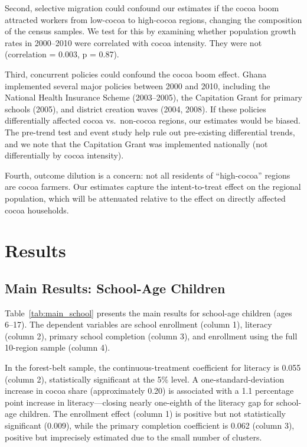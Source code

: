 \documentclass[12pt]{article}
\begin{document}
Second, selective migration could confound our estimates if the cocoa boom attracted workers from low-cocoa to high-cocoa regions, changing the composition of the census samples. We test for this by examining whether population growth rates in 2000--2010 were correlated with cocoa intensity. They were not (correlation = 0.003, p = 0.87).

Third, concurrent policies could confound the cocoa boom effect. Ghana implemented several major policies between 2000 and 2010, including the National Health Insurance Scheme (2003--2005), the Capitation Grant for primary schools (2005), and district creation waves (2004, 2008). If these policies differentially affected cocoa vs.\ non-cocoa regions, our estimates would be biased. The pre-trend test and event study help rule out pre-existing differential trends, and we note that the Capitation Grant was implemented nationally (not differentially by cocoa intensity).

Fourth, outcome dilution is a concern: not all residents of ``high-cocoa'' regions are cocoa farmers. Our estimates capture the intent-to-treat effect on the regional population, which will be attenuated relative to the effect on directly affected cocoa households.


\section{Results}
\label{sec:results}

\subsection{Main Results: School-Age Children}



Table~\ref{tab:main_school} presents the main results for school-age children (ages 6--17). The dependent variables are school enrollment (column 1), literacy (column 2), primary school completion (column 3), and enrollment using the full 10-region sample (column 4).

In the forest-belt sample, the continuous-treatment coefficient for literacy is 0.055 (column 2), statistically significant at the 5\% level. A one-standard-deviation increase in cocoa share (approximately 0.20) is associated with a 1.1 percentage point increase in literacy---closing nearly one-eighth of the literacy gap for school-age children. The enrollment effect (column 1) is positive but not statistically significant (0.009), while the primary completion coefficient is 0.062 (column 3), positive but imprecisely estimated due to the small number of clusters.
\end{document}
